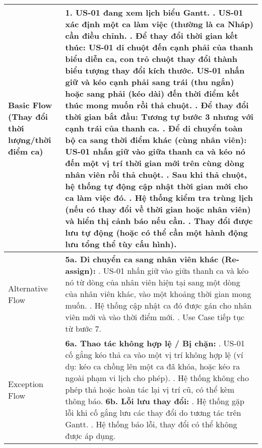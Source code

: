 \begin{longtable}{|m{4cm}|p{11cm}|}
Basic Flow (Thay đổi thời lượng/thời điểm ca) & 1. US-01 đang xem lịch biểu Gantt. \newline 2. US-01 xác định một ca làm việc (thường là ca Nháp) cần điều chỉnh. \newline 3. \textbf{Để thay đổi thời gian kết thúc:} US-01 di chuột đến cạnh phải của thanh biểu diễn ca, con trỏ chuột thay đổi thành biểu tượng thay đổi kích thước. US-01 nhấn giữ và kéo cạnh phải sang trái (thu ngắn) hoặc sang phải (kéo dài) đến thời điểm kết thúc mong muốn rồi thả chuột. \newline 4. \textbf{Để thay đổi thời gian bắt đầu:} Tương tự bước 3 nhưng với cạnh trái của thanh ca. \newline 5. \textbf{Để di chuyển toàn bộ ca sang thời điểm khác (cùng nhân viên):} US-01 nhấn giữ vào giữa thanh ca và kéo nó đến một vị trí thời gian mới trên cùng dòng nhân viên rồi thả chuột. \newline 6. Sau khi thả chuột, hệ thống tự động cập nhật thời gian mới cho ca làm việc đó. \newline 7. Hệ thống kiểm tra trùng lịch (nếu có thay đổi về thời gian hoặc nhân viên) và hiển thị cảnh báo nếu cần. \newline 8. Thay đổi được lưu tự động (hoặc có thể cần một hành động lưu tổng thể tùy cấu hình). \\
\hline
Alternative Flow & \textbf{5a. Di chuyển ca sang nhân viên khác (Re-assign):} \newline    1. US-01 nhấn giữ vào giữa thanh ca và kéo nó từ dòng của nhân viên hiện tại sang một dòng của nhân viên khác, vào một khoảng thời gian mong muốn. \newline    2. Hệ thống cập nhật ca đó được gán cho nhân viên mới và vào thời điểm mới. \newline    3. Use Case tiếp tục từ bước 7. \\
\hline
Exception Flow & \textbf{6a. Thao tác không hợp lệ / Bị chặn:} \newline    1. US-01 cố gắng kéo thả ca vào một vị trí không hợp lệ (ví dụ: kéo ca chồng lên một ca đã khóa, hoặc kéo ra ngoài phạm vi lịch cho phép). \newline    2. Hệ thống không cho phép thả hoặc hoàn tác lại vị trí cũ, có thể kèm thông báo. \newline \textbf{6b. Lỗi lưu thay đổi:} \newline    1. Hệ thống gặp lỗi khi cố gắng lưu các thay đổi do tương tác trên Gantt. \newline    2. Hệ thống báo lỗi, thay đổi có thể không được áp dụng. \\

\end{longtable}
